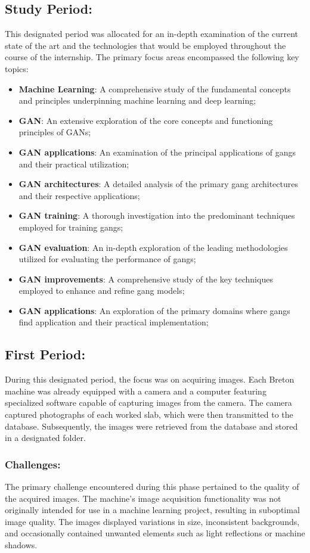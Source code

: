 \subsection{Study Period:}
This designated period was allocated for an in-depth examination of the current state of the art and the technologies that would be employed throughout the course of the internship. 
The primary focus areas encompassed the following key topics:
\begin{itemize}
    \item \textbf{Machine Learning}: A comprehensive study of the fundamental concepts and principles underpinning machine learning and deep learning;
    \item \textbf{GAN}: An extensive exploration of the core concepts and functioning principles of GANs;
    \item \textbf{GAN applications}: An examination of the principal applications of \gls{gang}s and their practical utilization;
    \item \textbf{GAN architectures}: A detailed analysis of the primary \gls{gang} architectures and their respective applications;
    \item \textbf{GAN training}: A thorough investigation into the predominant techniques employed for training \gls{gang}s;\@
    \item \textbf{GAN evaluation}: An in-depth exploration of the leading methodologies utilized for evaluating the performance of \gls{gang}s;\@
    \item \textbf{GAN improvements}: A comprehensive study of the key techniques employed to enhance and refine \gls{gang} models;\@
    \item \textbf{GAN applications}:  An exploration of the primary domains where \gls{gang}s find application and their practical implementation;
\end{itemize}
\subsection{First Period:}
During this designated period, the focus was on acquiring images. 
Each Breton machine was already equipped with a camera and a computer featuring specialized software capable of capturing images from the camera. 
The camera captured photographs of each worked slab, which were then transmitted to the database. 
Subsequently, the images were retrieved from the database and stored in a designated folder.
\subsubsection{Challenges:}
The primary challenge encountered during this phase pertained to the quality of the acquired images. 
The machine's image acquisition functionality was not originally intended for use in a machine learning project, resulting in suboptimal image quality. 
The images displayed variations in size, inconsistent backgrounds, and occasionally contained unwanted elements such as light reflections or machine shadows.
